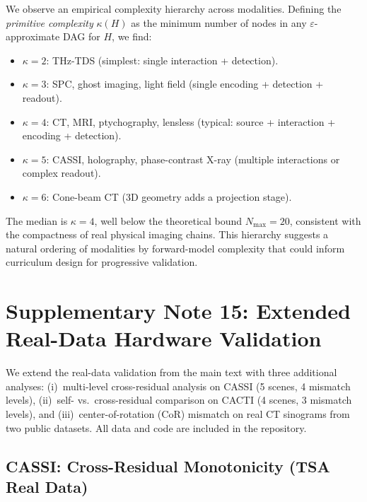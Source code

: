 \documentclass[11pt]{article}
\theoremstyle{definition}
\begin{document}
We observe an empirical complexity hierarchy across modalities.
Defining the \emph{primitive complexity} $\kappa(H)$ as the minimum
number of nodes in any $\varepsilon$-approximate DAG for $H$, we find:

\begin{itemize}
  \item $\kappa = 2$: THz-TDS (simplest: single interaction + detection).
  \item $\kappa = 3$: SPC, ghost imaging, light field (single encoding + detection + readout).
  \item $\kappa = 4$: CT, MRI, ptychography, lensless (typical: source + interaction + encoding + detection).
  \item $\kappa = 5$: CASSI, holography, phase-contrast X-ray (multiple interactions or complex readout).
  \item $\kappa = 6$: Cone-beam CT (3D geometry adds a projection stage).
\end{itemize}

\noindent The median is $\kappa = 4$, well below the theoretical bound
$N_{\max} = 20$, consistent with the compactness of real physical imaging
chains. This hierarchy suggests a natural ordering of modalities by
forward-model complexity that could inform curriculum design for
progressive validation.


\section{Supplementary Note 15: Extended Real-Data Hardware Validation}
\label{sec:real_data_extended}

We extend the real-data validation from the main text with three additional analyses:
(i)~multi-level cross-residual analysis on CASSI (5 scenes, 4 mismatch levels),
(ii)~self- vs.\ cross-residual comparison on CACTI (4 scenes, 3 mismatch levels),
and (iii)~center-of-rotation (CoR) mismatch on real CT sinograms from two public datasets.
All data and code are included in the repository.

\subsection{CASSI: Cross-Residual Monotonicity (TSA Real Data)}
\label{sec:cassi_cross}
\end{document}
